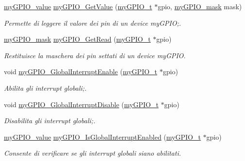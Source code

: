 \begin{DoxyCompactItemize}
\hyperlink{group__bare-metal_gaf634fe4a0e1eab8da5000b72d6ad362b}{my\+G\+P\+I\+O\+\_\+value} \hyperlink{group__bare-metal_ga2a20e519816733b90204b975edc4e212}{my\+G\+P\+I\+O\+\_\+\+Get\+Value} (\hyperlink{structmy_g_p_i_o__t}{my\+G\+P\+I\+O\+\_\+t} $\ast$gpio, \hyperlink{group__bare-metal_ga402a0d20afc0cb7c25554b8b023f4253}{my\+G\+P\+I\+O\+\_\+mask} mask)
\begin{DoxyCompactList}\small\item\em Permette di leggere il valore dei pin di un device my\+G\+P\+I\+O;. \end{DoxyCompactList}\item 
\hyperlink{group__bare-metal_ga402a0d20afc0cb7c25554b8b023f4253}{my\+G\+P\+I\+O\+\_\+mask} \hyperlink{group__bare-metal_gac35776cd6652f7b932a132f3f6959a11}{my\+G\+P\+I\+O\+\_\+\+Get\+Read} (\hyperlink{structmy_g_p_i_o__t}{my\+G\+P\+I\+O\+\_\+t} $\ast$gpio)
\begin{DoxyCompactList}\small\item\em Restituisce la maschera dei pin settati di un device my\+G\+P\+I\+O. \end{DoxyCompactList}\item 
void \hyperlink{group__bare-metal_gada93ef6a9818e634f0a233ce14582216}{my\+G\+P\+I\+O\+\_\+\+Global\+Interrupt\+Enable} (\hyperlink{structmy_g_p_i_o__t}{my\+G\+P\+I\+O\+\_\+t} $\ast$gpio)
\begin{DoxyCompactList}\small\item\em Abilita gli interrupt globali;. \end{DoxyCompactList}\item 
void \hyperlink{group__bare-metal_gaacca2871ac57a166e62bf431a2da7548}{my\+G\+P\+I\+O\+\_\+\+Global\+Interrupt\+Disable} (\hyperlink{structmy_g_p_i_o__t}{my\+G\+P\+I\+O\+\_\+t} $\ast$gpio)
\begin{DoxyCompactList}\small\item\em Disabilita gli interrupt globali;. \end{DoxyCompactList}\item 
\hyperlink{group__bare-metal_gaf634fe4a0e1eab8da5000b72d6ad362b}{my\+G\+P\+I\+O\+\_\+value} \hyperlink{group__bare-metal_ga0a753db3d02ad08014e4b7304e0f1829}{my\+G\+P\+I\+O\+\_\+\+Is\+Global\+Interrupt\+Enabled} (\hyperlink{structmy_g_p_i_o__t}{my\+G\+P\+I\+O\+\_\+t} $\ast$gpio)
\begin{DoxyCompactList}\small\item\em Consente di verificare se gli interrupt globali siano abilitati. \end{DoxyCompactList}\item 

\end{DoxyCompactItemize}
